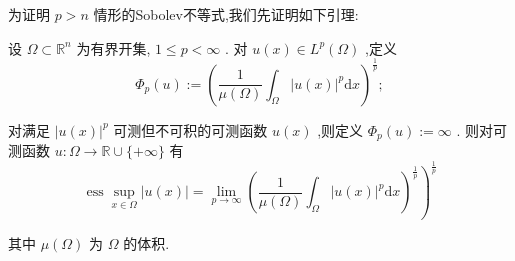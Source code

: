 \documentclass[lang=cn,newtx,10pt,scheme=chinese,thmcnt=chapter]{elegantbook}
\newcommand{\dif}{\mathrm{d}}
\begin{document}
为证明 \(p > n\) 情形的Sobolev不等式,我们先证明如下引理:

\begin{lemma}
     设 \(\Omega  \subset  {\mathbb{R}}^{n}\) 为有界开集, \(1 \leqslant  p < \infty\) . 对 \(u\left( x\right)  \in  {L}^{p}\left( \Omega \right)\) ,定义
\begin{equation*}
{\Phi }_{p}\left( u\right)  \mathrel{\text{ := }} {\left( \frac{1}{\mu \left( \Omega \right) }{\int }_{\Omega }{\left| u\left( x\right) \right| }^{p}\dif x\right) }^{\frac{1}{p}};
\end{equation*}

对满足 \({\left| u\left( x\right) \right| }^{p}\) 可测但不可积的可测函数 \(u\left( x\right)\) ,则定义 \({\Phi }_{p}\left( u\right)  \mathrel{\text{ := }} \infty\) . 则对可测函数 \(u : \Omega  \rightarrow  \mathbb{R} \cup  \{  + \infty \}\) 有
\begin{equation*}
{\left. \operatorname{ess}\mathop{\sup }\limits_{{x \in  \Omega }}\left| u\left( x\right) \right|  = \mathop{\lim }\limits_{{p \rightarrow  \infty }}{\left( \frac{1}{\mu \left( \Omega \right) }{\int }_{\Omega }{\left| u\left( x\right) \right| }^{p}\dif x\right) }^{\frac{1}{p}}\right) }^{\frac{1}{p}}
\end{equation*}

其中 \(\mu \left( \Omega \right)\) 为 \(\Omega\) 的体积.
\end{lemma}
\end{document}
